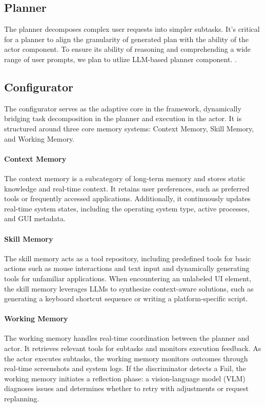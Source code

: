 \documentclass[11pt,letterpaper]{article}
\begin{document}
%
\subsection{Planner}
%
The planner decomposes complex user requests into simpler subtasks. 
%
It's critical for a planner to align the granularity of generated plan with the ability of the actor component.
%
To ensure its ability of reasoning and comprehending a wide range of user prompts, we plan to utlize LLM-based planner component. \cite{planandsolve}.
%
\subsection{Configurator}
%
The configurator serves as the adaptive core in the framework, dynamically bridging task decomposition in the planner and execution in the actor.
%
It is structured around three core memory systems: Context Memory, Skill Memory, and Working Memory.
%
\paragraph{Context Memory}
%
The context memory is a subcategory of long-term memory and stores static knowledge and real-time context.
%
It retains user preferences, such as preferred tools or frequently accessed applications. 
%
Additionally, it continuously updates real-time system states, including the operating system type, active processes, and GUI metadata.
%

\paragraph{Skill Memory}
%
The skill memory acts as a tool repository, including predefined tools for basic actions such as mouse interactions and text input and dynamically generating tools for unfamiliar applications.
%
When encountering an unlabeled UI element, the skill memory leverages LLMs to synthesize context-aware solutions, such as generating a keyboard shortcut sequence or writing a platform-specific script.
%
\paragraph{Working Memory}
%
The working memory handles real-time coordination between the planner and actor.
%
It retrieves relevant tools for subtasks and monitors execution feedback.
%
As the actor executes subtasks, the working memory monitors outcomes through real-time screenshots and system logs.
%
If the discriminator detects a Fail, the working memory initiates a reflection phase: a vision-language model (VLM) diagnoses issues and determines whether to retry with adjustments or request replanning.
%
\end{document}
